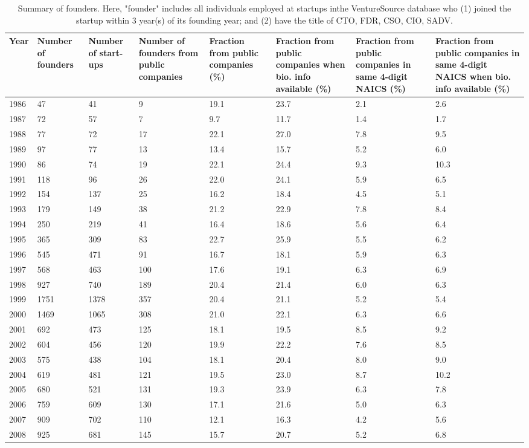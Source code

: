 \begin{table}[!htb]
\centering
\begingroup\scriptsize
\begin{tabular}{p{1.75cm}p{1.75cm}p{1.75cm}p{1.75cm}p{1.75cm}p{1.75cm}p{1.75cm}p{1.75cm}}
  \toprule
Year & Number of founders & Number of start-ups & Number of founders from public companies & Fraction from public companies (\%) & Fraction from public companies when bio. info available (\%) & Fraction from public companies in same 4-digit NAICS (\%) & Fraction from public companies in same 4-digit NAICS when bio. info available (\%) \\ 
  \midrule
1986 & 47 & 41 &  9 & 19.1 & 23.7 & 2.1 & 2.6 \\ 
  1987 & 72 & 57 &  7 & 9.7 & 11.7 & 1.4 & 1.7 \\ 
  1988 & 77 & 72 & 17 & 22.1 & 27.0 & 7.8 & 9.5 \\ 
  1989 & 97 & 77 & 13 & 13.4 & 15.7 & 5.2 & 6.0 \\ 
  1990 & 86 & 74 & 19 & 22.1 & 24.4 & 9.3 & 10.3 \\ 
  1991 & 118 & 96 & 26 & 22.0 & 24.1 & 5.9 & 6.5 \\ 
  1992 & 154 & 137 & 25 & 16.2 & 18.4 & 4.5 & 5.1 \\ 
  1993 & 179 & 149 & 38 & 21.2 & 22.9 & 7.8 & 8.4 \\ 
  1994 & 250 & 219 & 41 & 16.4 & 18.6 & 5.6 & 6.4 \\ 
  1995 & 365 & 309 & 83 & 22.7 & 25.9 & 5.5 & 6.2 \\ 
  1996 & 545 & 471 & 91 & 16.7 & 18.1 & 5.9 & 6.3 \\ 
  1997 & 568 & 463 & 100 & 17.6 & 19.1 & 6.3 & 6.9 \\ 
  1998 & 927 & 740 & 189 & 20.4 & 21.4 & 6.0 & 6.3 \\ 
  1999 & 1751 & 1378 & 357 & 20.4 & 21.1 & 5.2 & 5.4 \\ 
  2000 & 1469 & 1065 & 308 & 21.0 & 22.1 & 6.3 & 6.6 \\ 
  2001 & 692 & 473 & 125 & 18.1 & 19.5 & 8.5 & 9.2 \\ 
  2002 & 604 & 456 & 120 & 19.9 & 22.2 & 7.6 & 8.5 \\ 
  2003 & 575 & 438 & 104 & 18.1 & 20.4 & 8.0 & 9.0 \\ 
  2004 & 619 & 481 & 121 & 19.5 & 23.0 & 8.7 & 10.2 \\ 
  2005 & 680 & 521 & 131 & 19.3 & 23.9 & 6.3 & 7.8 \\ 
  2006 & 759 & 609 & 130 & 17.1 & 21.6 & 5.0 & 6.3 \\ 
  2007 & 909 & 702 & 110 & 12.1 & 16.3 & 4.2 & 5.6 \\ 
  2008 & 925 & 681 & 145 & 15.7 & 20.7 & 5.2 & 6.8 \\ 
   \bottomrule
\end{tabular}
\endgroup
\caption{Summary of founders. Here, "founder" includes all individuals employed at startups inthe VentureSource database who (1) joined the startup within 3 year(s) of its founding year; and (2) have the title of CTO, FDR, CSO, CIO, SADV.} 
\label{table:GStable_technical}
\end{table}
